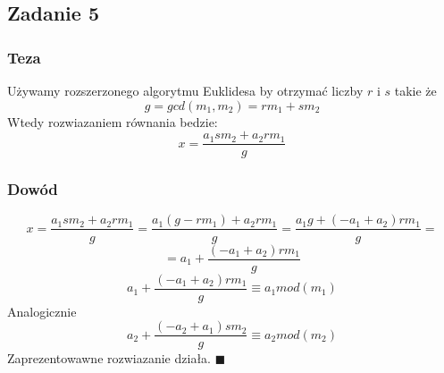 \subsection{Zadanie 5}
\subsubsection{Teza}
Używamy rozszerzonego algorytmu Euklidesa by otrzymać liczby $r$ i $s$ takie że $$g = gcd(m_1, m_2) = rm_1+sm_2$$ Wtedy rozwiazaniem równania bedzie:
$$x = \frac{a_1sm_2 +a_2rm_1}{g}$$
\subsubsection{Dowód}
$$x=\frac{a_1sm_2 +a_2rm_1}{g} =\frac{a_1(g-rm_1)+a_2rm_1}{g}= \frac{a_1g+(-a_1+a_2)rm_1}{g}=$$
$$= a_1+ \frac{(-a_1+a_2)rm_1}{g}$$
$$a_1+ \frac{(-a_1+a_2)rm_1}{g}\equiv a_1 mod (m_1)$$
Analogicznie
$$a_2+ \frac{(-a_2+a_1)sm_2}{g}\equiv a_2 mod (m_2)$$
Zaprezentowawne rozwiazanie działa. $\blacksquare$